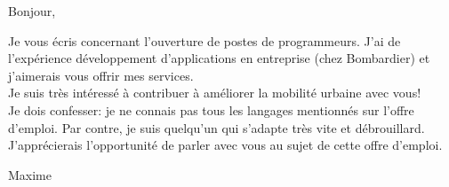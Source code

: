 \documentclass[12pt,french]{letter}
\begin{document}

\begin{letter}{}
\address{Montréal, Canada}

\opening{Bonjour,}


Je vous écris concernant l'ouverture de postes de programmeurs. 
J'ai de l'expérience développement d'applications en entreprise (chez Bombardier) et j'aimerais vous offrir mes services.\\
Je suis très intéressé à contribuer à améliorer la mobilité urbaine avec vous! \\ Je dois confesser: je ne connais pas tous les langages mentionnés sur l'offre d'emploi. Par contre, je suis quelqu'un qui s'adapte très vite et débrouillard. \\
J'apprécierais l'opportunité de parler avec vous au sujet de cette offre d'emploi.

\closing{Maxime}


\end{letter}
\end{document}
